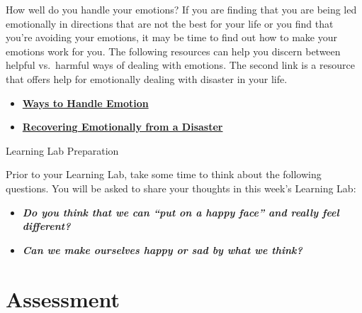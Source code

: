 \documentclass[
]{book}
\providecommand{\tightlist}{%
  \setlength{\itemsep}{0pt}\setlength{\parskip}{0pt}}
\begin{document}
\begin{reflect}
How well do you handle your emotions? If you are finding that you are being led emotionally in directions that are not the best for your life or you find that you're avoiding your emotions, it may be time to find out how to make your emotions work for you. The following resources can help you discern between helpful vs.~harmful ways of dealing with emotions. The second link is a resource that offers help for emotionally dealing with disaster in your life.

\begin{itemize}
\tightlist
\item
  \href{https://www.mhanational.org/helpful-vs-harmful-ways-manage-emotions}{\textbf{Ways to Handle Emotion}}\\
\item
  \href{https://www.apa.org/helpcenter/recovering-disasters}{\textbf{Recovering Emotionally from a Disaster}}
\end{itemize}

{Learning Lab Preparation}

Prior to your Learning Lab, take some time to think about the following questions. You will be asked to share your thoughts in this week's Learning Lab:

\begin{itemize}
\tightlist
\item
  \textbf{\emph{Do you think that we can ``put on a happy face'' and really feel different?}}\\
\item
  \textbf{\emph{Can we make ourselves happy or sad by what we think?}}
\end{itemize}
\end{reflect}

\hypertarget{assessment-7}{%
\section*{Assessment}\label{assessment-7}}
\end{document}
